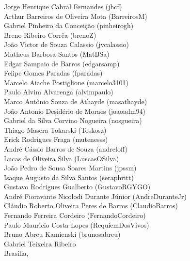 \documentclass[12pt]{book}
\begin{document}
\begin{titlepage}
\begin{center}
 \vspace{1.5cm}
{\large	%
	Jorge Henrique Cabral Fernandes (jhcf)\\
	Arthur Barreiros de Oliveira Mota (BarreirosM)\\
    Gabriel Pinheiro da Conceição (pinheirogh)\\
    Breno Ribeiro Corrêa (brenoZ)\\
    João Victor de Souza Calassio (jvcalassio)\\
    Matheus Barbosa Santos (MatBSa)\\
    Edgar Sampaio de Barros (edgarsamp) \\
    Felipe Gomes Paradas (fparadas) \\
    Marcelo Aiache Postiglione (marcelo3101) \\
    Paulo Alvim Alvarenga (alvimpaulo)\\
    Marco Antônio Souza de Athayde (masathayde)\\
    João Antonio Desidério de Moraes (joaoadm94)\\
    Gabriel da Silva Corvino Nogueira (nosgueira)\\
    Thiago Masera Tokarski (Toskosz)\\
    Erick Rodrigues Fraga (mutenesss)\\
    André Cássio Barros de Souza (andreloff)\\
    Lucas de Oliveira Silva (LuscasOSilva)\\
    João Pedro de Sousa Soares Martins (jpssm)\\
	Isaque Augusto da Silva Santos (seraphritt)\\
	Gustavo Rodrigues Gualberto (GustavoRGYGO)\\
    André Fioravante Nicolodi Durante Júnior (AndreDuranteJr)\\
	Cláudio Roberto Oliveira Peres de Barros (ClaudioBarros)\\ 
        Fernando Ferreira Cordeiro (FernandoCordeiro)\\
        Paulo Mauricio Costa Lopes (RequiemDosVivos)\\
	Bruno Abreu Kamienski (brunosabreu)\\
	Gabriel Teixeira Ribeiro\\
 }
	\vspace{1.5cm}
	{\large Brasília, \DTMnow}
\end{center}
\end{titlepage}
    \listoftodos
	\printnoidxglossary
	\tableofcontents
	\listoffigures
	\listoftables
	\clearpage
{}
\end{document}
